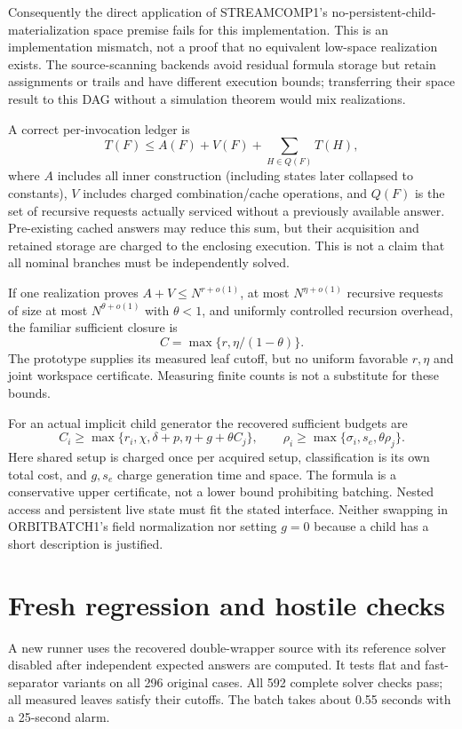 \documentclass[11pt]{article}
\begin{document}
Consequently the direct application of STREAMCOMP1's no-persistent-child-
materialization space premise fails for this implementation. This is an
implementation mismatch, not a proof that no equivalent low-space realization
exists. The source-scanning backends avoid residual formula storage but retain
assignments or trails and have different execution bounds; transferring their
space result to this DAG without a simulation theorem would mix realizations.

A correct per-invocation ledger is
\[
T(F)\le A(F)+V(F)+\sum_{H\in Q(F)}T(H),
\]
where $A$ includes all inner construction (including states later collapsed to
constants), $V$ includes charged combination/cache operations, and $Q(F)$ is
the set of recursive requests actually serviced without a previously available
answer. Pre-existing cached answers may reduce this sum, but their acquisition
and retained storage are charged to the enclosing execution. This is not a
claim that all nominal branches must be independently solved.

If one realization proves $A+V\le N^{r+o(1)}$, at most $N^{\eta+o(1)}$
recursive requests of size at most $N^{\theta+o(1)}$ with $\theta<1$, and
uniformly controlled recursion overhead, the familiar sufficient closure is
\[
C=\max\{r,\eta/(1-\theta)\}.
\]
The prototype supplies its measured leaf cutoff, but no uniform favorable
$r,\eta$ and joint workspace certificate. Measuring finite counts is not a
substitute for these bounds.

For an actual implicit child generator the recovered sufficient budgets are
\[
 C_i\ge\max\{r_i,\chi,\delta+p,\eta+g+\theta C_j\},\qquad
 \rho_i\ge\max\{\sigma_i,s_e,\theta\rho_j\}.
\]
Here shared setup is charged once per acquired setup, classification is its
own total cost, and $g,s_e$ charge generation time and space. The formula is
a conservative upper certificate, not a lower bound prohibiting batching.
Nested access and persistent live state must fit the stated interface.
Neither swapping in ORBITBATCH1's field normalization nor setting $g=0$
because a child has a short description is justified.

\section*{Fresh regression and hostile checks}
A new runner uses the recovered double-wrapper source with its reference
solver disabled after independent expected answers are computed. It tests
flat and fast-separator variants on all 296 original cases. All 592 complete
solver checks pass; all measured leaves satisfy their cutoffs. The batch takes
about 0.55 seconds with a 25-second alarm.
\end{document}
